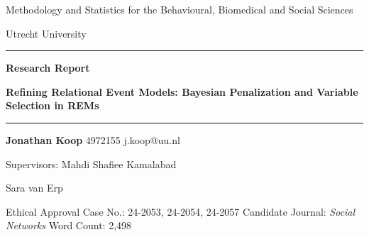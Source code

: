\documentclass{article}
\begin{document}

\begin{titlepage}
\begin{center}

\Large 

Methodology and Statistics for the Behavioural, Biomedical and Social Sciences \vspace{0.5cm}

Utrecht University
    
\vspace{0.5cm}
      
\rule{\textwidth}{1.5pt}
\LARGE
\textbf{Research Report}

\vspace{0.25cm}
\textbf{Refining Relational Event Models: Bayesian Penalization and Variable Selection in REMs} \\
\vspace{0.25cm}
\rule{\textwidth}{1.5pt}

\vfill

\Large
\textbf{Jonathan Koop} \vskip 0.05in
\normalsize
4972155 \vskip 0.05in
j.koop@uu.nl

      

\vfill

\normalsize

Supervisors: \vskip 0.05in
\large
Mahdi Shafiee Kamalabad 

Sara van Erp \vskip 0.05in

\vfill

\normalsize
Ethical Approval Case No.: 24-2053, 24-2054, 24-2057\vskip 0.05in
Candidate Journal: \textit{Social Networks} \vskip 0.05in
Word Count: 2,498

\end{center}
\end{titlepage}


\end{document}
